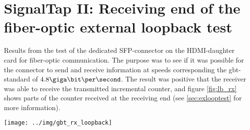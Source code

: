 \documentclass[main.tex]{subfiles}
\begin{document}
\chapter{SignalTap II: Receiving end of the fiber-optic external loopback test}

Results from the test of the dedicated SFP-connector on the HDMI-daughter card for fiber-optic communication. The purpose was to see if it was possible for the connector to send and receive information at speeds corresponding the \gls{gbt}-standard of $4.8 \giga\bit\per\second$. The result was positive that the receiver was able to receive the transmitted incremental counter, and figure \ref{fig:lb_rx} shows parts of the counter received at the receiving end (see \ref{sec:exlooptest} for more information).   

\begin{sidewaysfigure}[H] %
\begin{center}
\texttt{[image: ../img/gbt\_rx\_loopback]}  \\[0.1 cm]
\caption{Receiving end of the fiber-optic external loopback test.}
\label{fig:lb_rx}
\end{center}
\end{sidewaysfigure}
\end{document}
